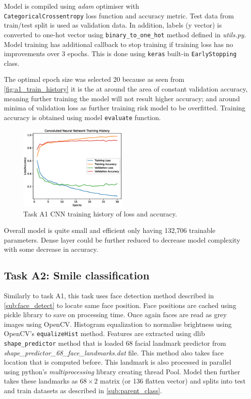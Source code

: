 \documentclass{article}
\begin{document}
Model is compiled using \textit{adam} optimiser with \\ \texttt{CategoricalCrossentropy} loss function and accuracy metric.
Test data from train/test split is used as validation data. In addition, labels (y vector) is converted to one-hot vector using \texttt{binary\_to\_one\_hot} method defined in \textit{utils.py}. Model training has additional callback to stop training if training loss has no improvements over 3 epochs. This is done using \texttt{keras} built-in \texttt{EarlyStopping} class.

The optimal epoch size was selected 20 because as seen from \autoref{fig:a1_train_history} it is the at around the area of constant validation accuracy, meaning further training the model will not result higher accuracy; and around minima of validation loss as further training risk model to be overfitted. Training accuracy is obtained using model \texttt{evaluate} function.

\begin{figure}[htb]
	\centering
	\includegraphics[width=0.48\textwidth]{graphics/A1_train.eps}
	\caption{Task A1 CNN training history of loss and accuracy.}
	\label{fig:a1_train_history}
\end{figure}

Overall model is quite small and efficient only having 132,706 trainable parameters. Dense layer could be further reduced to decrease model complexity with some decrease in accuracy.

\subsection{Task A2: Smile classification}

Similarly to task A1, this task uses face detection method described in \autoref{sub:face_detect} to locate same face position. Face positions are cached using pickle library to save on processing time. Once again faces are read as grey images using OpenCV. Histogram equalization to normalise brightness using OpenCV's \texttt{equalizeHist} method. Features are extracted using dlib \texttt{shape\_predictor} method that is loaded 68 facial landmark predictor from \\\textit{shape\_predictor\_68\_face\_landmarks.dat} file. This method also takes face location that is computed before. 
This landmark is also processed in parallel using python's \textit{multiprocessing} library creating thread Pool. Model then further takes these landmarks as $68 \times 2$ matrix (or 136 flatten vector) and splits into test and train datasets as described in \autoref{sub:parent_class}.
\end{document}
